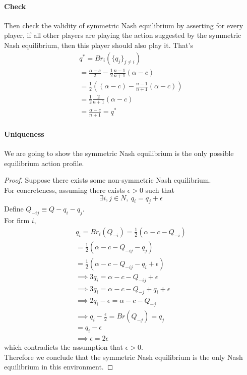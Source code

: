 \documentclass[11pt]{article}
\begin{document}
\begin{example}
		\paragraph{Check}Then check the validity of symmetric Nash equilibrium by asserting for every player, if all other players are playing the action suggested by the symmetric Nash equilibrium, then this player should also play it. That's
		\begin{gather}
			q^* = Br_i(\{q_j\}_{j\neq i}) \\
			= \frac{\alpha - c}{2} - \frac{1}{2} \frac{n-1}{n+1} (\alpha - c) \\
			= \frac{1}{2}((\alpha - c) - \frac{n-1}{n+1}(\alpha - c)) \\
			= \frac{1}{2} \frac{2}{n+1}(\alpha - c) \\
			= \frac{\alpha - c}{n + 1} 
			= q^*
		\end{gather}
		\paragraph{Uniqueness} We are going to show the symmetric Nash equilibrium is the only possible equilibrium action profile. \\
		\begin{proof}
			Suppose there exists some non-symmetric Nash equilibrium. \\
			For concreteness, assuming there exists $\epsilon > 0$ such that
			\begin{equation}
				\exists i, j \in N,\ q_i = q_j + \epsilon
			\end{equation}
			Define $Q_{-ij} \equiv Q - q_i - q_j$.\\
			For firm $i$,
			\begin{gather}
				q_i = Br_i(Q_{-i}) = \frac{1}{2} (\alpha - c - Q_{-i}) \\
				= \frac{1}{2}(\alpha - c - Q_{-ij} - q_{j}) \\
				= \frac{1}{2}(\alpha - c - Q_{-ij} - q_i + \epsilon) \\
				\implies 3 q_i = \alpha - c - Q_{-ij} + \epsilon \\
				\implies 3 q_i = \alpha - c - Q_{-j} + q_i + \epsilon \\
				\implies 2 q_i - \epsilon = \alpha - c - Q_{-j} \\
				\implies  q_i - \frac{\epsilon}{2} = Br(Q_{-j}) = q_j \\
				= q_i - \epsilon \\
				\implies \epsilon = 2 \epsilon
			\end{gather}
			which contradicts the assumption that $\epsilon > 0$. \\
			Therefore we conclude that the symmetric Nash equilibrium is the only Nash equilibrium in this environment.
		\end{proof}
	\end{example}
	
\end{document}
